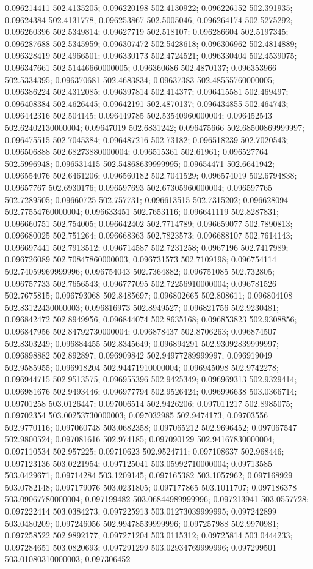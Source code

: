 0.096214411 502.4135205; 0.096220198 502.4130922; 0.096226152 502.391935; 0.09624384 502.4131778; 0.096253867 502.5005046; 0.096264174 502.5275292; 0.096260396 502.5349814; 0.09627719 502.518107; 0.096286604 502.5197345; 0.096287688 502.5345959; 0.096307472 502.5428618; 0.096306962 502.4814889; 0.096328419 502.4966501; 0.096330173 502.4724521; 0.096330404 502.4539075; 0.096347661 502.51446660000005; 0.096360686 502.4870137; 0.096353966 502.5334395; 0.096370681 502.4683834; 0.09637383 502.48555760000005; 0.096386224 502.4312085; 0.096397814 502.414377; 0.096415581 502.469497; 0.096408384 502.4626445; 0.09642191 502.4870137; 0.096434855 502.464743; 0.096442316 502.504145; 0.096449785 502.53540960000004; 0.096452543 502.62402130000004; 0.09647019 502.6831242; 0.096475666 502.68500869999997; 0.096475515 502.7045384; 0.096487216 502.73182; 0.096518239 502.7020543; 0.096506888 502.68273880000004; 0.096515361 502.61961; 0.096527764 502.5996948; 0.096531415 502.54868639999995; 0.09654471 502.6641942; 0.096554076 502.6461206; 0.096560182 502.7041529; 0.096574019 502.6794838; 0.09657767 502.6930176; 0.096597693 502.67305960000004; 0.096597765 502.7289505; 0.09660725 502.757731; 0.096613515 502.7315202; 0.096628094 502.77554760000004; 0.096633451 502.7653116; 0.096641119 502.8287831; 0.096660751 502.754005; 0.096642402 502.7714789; 0.096659077 502.7890813; 0.096680025 502.751264; 0.096668363 502.7823573; 0.096688107 502.7614143; 0.096697441 502.7913512; 0.096714587 502.7231258; 0.0967196 502.7417989; 0.096726089 502.70847860000003; 0.096731573 502.7109198; 0.096754114 502.74059969999996; 0.096754043 502.7364882; 0.096751085 502.732805; 0.096757733 502.7656543; 0.096777095 502.72256910000004; 0.096781526 502.7675815; 0.096793068 502.8485697; 0.096802665 502.808611; 0.096804108 502.83122430000003; 0.096816973 502.8949527; 0.096821756 502.9230481; 0.096842472 502.8949956; 0.096844074 502.8635168; 0.096853823 502.9308856; 0.096847956 502.84792730000004; 0.096878437 502.8706263; 0.096874507 502.8303249; 0.096884455 502.8345649; 0.096894291 502.93092839999997; 0.096898882 502.892897; 0.096909842 502.94977289999997; 0.096919049 502.9585955; 0.096918204 502.94471910000004; 0.096945098 502.9742278; 0.096944715 502.9513575; 0.096955396 502.9425349; 0.096969313 502.9329414; 0.096981676 502.9493446; 0.096977794 502.9526424; 0.096996638 503.0366714; 0.09701258 503.0126447; 0.097006514 502.9426206; 0.097011217 502.8985075; 0.09702354 503.00253730000003; 0.097032985 502.9474173; 0.09703556 502.9770116; 0.097060748 503.0682358; 0.097065212 502.9696452; 0.097067547 502.9800524; 0.097081616 502.974185; 0.097090129 502.94167830000004; 0.097110534 502.957225; 0.09710623 502.9524711; 0.097108637 502.968446; 0.097123136 503.0221954; 0.097125041 503.05992710000004; 0.09713585 503.0429671; 0.09714284 503.1209145; 0.097165382 503.1057962; 0.097168929 503.0782148; 0.097179076 503.0231805; 0.097177865 503.1011707; 0.097186378 503.09067780000004; 0.097199482 503.06844989999996; 0.097213941 503.0557728; 0.097222414 503.0384273; 0.097225913 503.01273039999995; 0.097242899 503.0480209; 0.097246056 502.99478539999996; 0.097257988 502.9970981; 0.097258522 502.9892177; 0.097271204 503.0115312; 0.09725814 503.0444233; 0.097284651 503.0820693; 0.097291299 503.02934769999996; 0.097299501 503.01080310000003; 0.097306452 